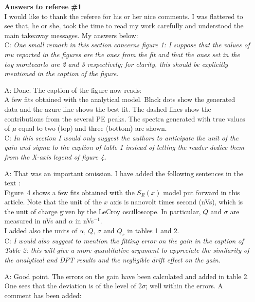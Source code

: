 \documentclass[a4paper,11pt]{article}
\begin{document}
{\bf Answers to referee \#1}
\\[1ex] 

I would like to thank the referee for his or her nice comments.
I was flattered to see that, he or she, took the time to read my work carefully and understood the main takeaway messages.  
My answers below:
\\[1ex]

C: \emph{ One small remark in this section concerns figure 1: I suppose that the values of mu reported in the figures are the ones from the fit and that the ones set in the toy montecarlo are 2 and 3 respectively; 
for clarity, this should be explicitly mentioned in the caption of the figure. }

A: Done. The caption of the figure now reads:
\\[1ex]

A few fits obtained with the analytical model. 
Black dots show the generated data and the azure line shows the best fit. The dashed lines show the contributions from the several PE peaks. 
The spectra generated with true values of $\mu$ equal to two (top) and three (bottom) are shown.
\\[1ex]

C: \emph{In this section I would only suggest the authors to anticipate the unit of the gain and sigma to the caption of table 1 instead of letting the reader dedice them from the X-axis legend of figure 4.}

A: That was an important omission. I have added the following sentences in the text :
\\[1ex]

Figure~4 shows  a few fits obtained with the $S_R(x)$ model put forward in this article. 
Note that the unit of the $x$ axis is nanovolt times second (nVs), which is the unit of charge given by the LeCroy oscilloscope.
In particular, $Q$ and $\sigma$ are measured in nVs and $\alpha$ in nVs$^{-1}$.
\\[1ex]

I  added  also the units of $\alpha$, $Q$, $\sigma$ and $Q_s$ in tables 1 and 2. 
\\[1ex]

C: \emph{ I would also suggest to mention the fitting error on the gain in the caption of Table 2: 
this will give a more quantitative argument to appreciate the similarity of the analytical and DFT results and the negligible drift effect on the gain. }

A: Good point. The errors on the gain have been calculated and added in table 2.
One sees that the deviation is of the level of 2$\sigma$; well within the errors. 
A comment has been added:
\\[1ex]
\end{document}
